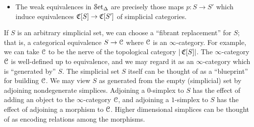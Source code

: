 \begin{1.2.14 Presentations of inf-cats}
\begin{itemize}
\item The weak equivalences in $\operatorname{\mathcal{S}et_{\Delta}}$ are precisely those maps
$p: S \rightarrow S'$ which induce equivalences $\operatorname{\mathfrak{C}}[S] \rightarrow \operatorname{\mathfrak{C}}[S']$
of simplicial categories.
\end{itemize}

If $S$ is an arbitrary simplicial set, we can
choose a ``fibrant replacement'' for $S$; that is, a categorical
equivalence $S \rightarrow \operatorname{\mathcal{C}}$ where $\operatorname{\mathcal{C}}$ is an $\infty$-category. 
For example, we can take $\operatorname{\mathcal{C}}$ to be the nerve of the topological
category $| \operatorname{\mathfrak{C}}[S] |$. 
The $\infty$-category $\operatorname{\mathcal{C}}$ is
well-defined up to equivalence, and we may
regard it as an $\infty$-category which is ``generated by'' $S$. The simplicial set $S$ itself can be thought of as a ``blueprint'' for building $\operatorname{\mathcal{C}}$. We may view $S$ as generated from the empty (simplicial) set by adjoining nondegenerate simplices. Adjoining a $0$-simplex to $S$ has the effect of adding an object to the $\infty$-category $\operatorname{\mathcal{C}}$, and adjoining a $1$-simplex to $S$ has the effect of adjoining a morphism to $\operatorname{\mathcal{C}}$. Higher dimensional simplices can be thought of as encoding relations among the morphisms.
\end{1.2.14 Presentations of inf-cats}
